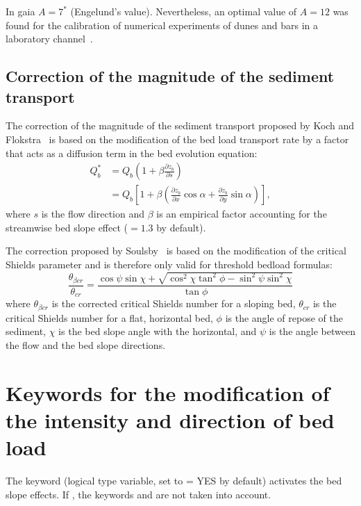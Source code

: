 In gaia{} $A=7^*$ (Engelund's value). Nevertheless, an optimal value of $A=12$ was found for the calibration of numerical experiments of dunes and bars in a laboratory channel~\cite{Mendoza15}.

\subsection{Correction of the magnitude of the sediment transport}
The correction of the magnitude of the sediment transport proposed by Koch and Flokstra~\cite{KochFlokstra80} is based on the modification of the bed load transport rate by a factor that acts as a diffusion term in the bed evolution equation:
\begin{equation}
\begin{array}{ll} \displaystyle
Q_b^* &= Q_{b}\left(1+\beta\frac{\partial z_b}{\partial s}\right) \\
    &= Q_{b}\left[1 + \beta \left(\frac{\partial z_b}{\partial x} \cos\alpha + \frac{\partial z_b}{\partial y} \sin\alpha\right)\right],
\end{array}
\end{equation}
where $s$ is the flow direction and $\beta$ is an empirical factor accounting for the streamwise bed slope effect ($=1.3$ by default).

The correction proposed by Soulsby~\cite{Soulsby97} is based on the modification of the critical Shields parameter and is therefore only valid for threshold bedload formulas:
\begin{equation*}
\frac{\theta_{\beta cr}}{\theta_{cr}} = \frac{\cos\psi \sin\chi +
\sqrt{\cos^2\chi \tan^2\phi - \sin^2\psi \sin^2\chi}}{\tan
\phi}
\end{equation*}
where $\theta_{\beta cr}$ is the corrected critical Shields number for a sloping bed, $\theta_{cr}$ is the critical Shields number for a flat, horizontal bed, $\phi$ is the angle of repose of the sediment, $\chi$ is the bed slope angle with the horizontal, and $\psi$ is the angle between the flow and the bed slope directions.

\section{Keywords for the modification of the intensity and direction of bed load}
The keyword  (logical type variable, set to {\ttfamily = YES} by default) activates the bed slope effects. If , the keywords  and  are not taken into account.

